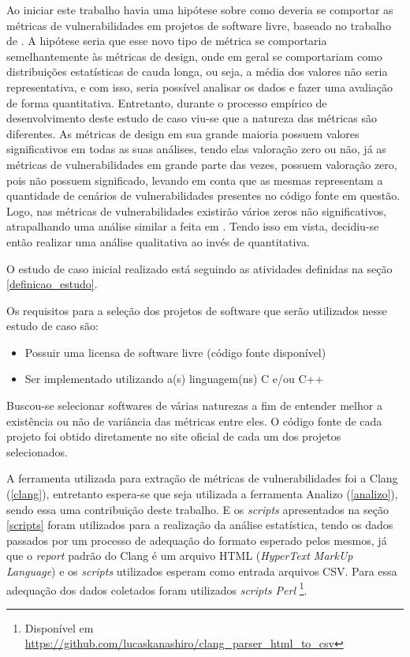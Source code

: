 Ao iniciar este trabalho havia uma hipótese sobre como deveria se comportar as métricas de vulnerabilidades em projetos de
software livre, baseado no trabalho de \cite{meirelles2013}. A hipótese seria que esse novo tipo de métrica se comportaria
semelhantemente às métricas de design, onde em geral se comportariam como distribuições estatísticas de cauda longa, ou seja, 
a média dos valores não seria representativa, e com isso, seria possível analisar os dados e fazer uma avaliação de forma 
quantitativa. Entretanto, durante o processo empírico de desenvolvimento deste estudo de caso viu-se que a natureza das 
métricas são diferentes. As métricas de design em sua grande maioria possuem valores significativos em todas as suas análises, 
tendo elas valoração zero ou não, já as métricas de vulnerabilidades em grande parte das vezes, possuem valoração zero, pois 
não possuem significado, levando em conta que as mesmas representam a quantidade de cenários de vulnerabilidades presentes no 
código fonte em questão. Logo, nas métricas de vulnerabilidades existirão vários zeros não significativos, atrapalhando uma 
análise similar a feita em \cite{meirelles2013}. Tendo isso em vista, decidiu-se então realizar uma análise qualitativa ao 
invés de quantitativa.

O estudo de caso inicial realizado está seguindo as atividades definidas na seção \ref{definicao_estudo}.

Os requisitos para a seleção dos projetos de software que serão utilizados nesse estudo de caso são:

\begin{itemize}
  \item Possuir uma licensa de software livre (código fonte disponível)
  \item Ser implementado utilizando a(s) linguagem(ns) C e/ou C++
\end{itemize}

Buscou-se selecionar softwares de várias naturezas a fim de entender melhor a existência ou não de variância das métricas entre 
eles. O código fonte de cada projeto foi obtido diretamente no site oficial de cada um dos projetos selecionados.

A ferramenta utilizada para extração de métricas de vulnerabilidades foi a Clang (\ref{clang}), entretanto espera-se que seja 
utilizada a ferramenta Analizo (\ref{analizo}), sendo essa uma contribuição deste trabalho. E os \textit{scripts} apresentados 
na seção \ref{scripts} foram utilizados para a realização da análise estatística, tendo os dados passados por um processo de 
adequação do formato esperado pelos mesmos, já que o \textit{report} padrão do Clang é um arquivo HTML (\textit{HyperText MarkUp
Language}) e os \textit{scripts} utilizados esperam como entrada arquivos CSV. Para essa adequação dos dados coletados foram
utilizados \textit{scripts Perl} \footnote{Disponível em
\url{https://github.com/lucaskanashiro/clang\_parser\_html\_to\_csv}}.


